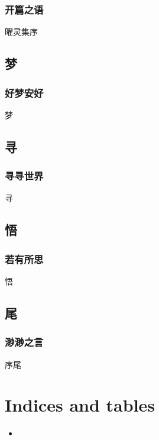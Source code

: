 \documentclass[letterpaper,10pt,english]{sphinxmanual}
\begin{document}
\subsection{开篇之语}
\label{\detokenize{poem/Preface:id2}}
曜灵集序


\section{梦}
\label{\detokenize{poem/Chap1::doc}}\label{\detokenize{poem/Chap1:id3}}\label{\detokenize{poem/Chap1:id1}}

\subsection{好梦安好}
\label{\detokenize{poem/Chap1:id2}}
梦


\section{寻}
\label{\detokenize{poem/Chap2::doc}}\label{\detokenize{poem/Chap2:id3}}\label{\detokenize{poem/Chap2:id1}}

\subsection{寻寻世界}
\label{\detokenize{poem/Chap2:id2}}
寻


\section{悟}
\label{\detokenize{poem/Chap3::doc}}\label{\detokenize{poem/Chap3:id3}}\label{\detokenize{poem/Chap3:id1}}

\subsection{若有所思}
\label{\detokenize{poem/Chap3:id2}}
悟


\section{尾}
\label{\detokenize{poem/END::doc}}\label{\detokenize{poem/END:id3}}\label{\detokenize{poem/END:id1}}

\subsection{渺渺之言}
\label{\detokenize{poem/END:id2}}
序尾


\chapter{Indices and tables}
\label{\detokenize{index:indices-and-tables}}\label{\detokenize{index:id3}}\begin{itemize}
\item {} 

\end{itemize}



\renewcommand{\indexname}{Index}
\printindex
\end{document}
